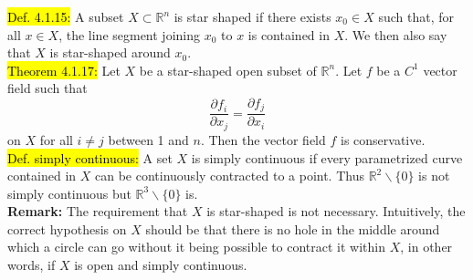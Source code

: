\documentclass[10pt,landscape]{article}
\newcommand{\green}[1]{\sethlcolor{green}\hl{#1}}
\newcommand{\blue}[1]{\sethlcolor{cyan} \hl{#1}}
\begin{document}
\begin{multicols}{3}
\blue{Def. 4.1.15:} A subset $X \subset \mathbb{R}^{n}$ is star shaped if there exists $x_{0} \in X$ such that, for all $x \in X$, 
the line segment joining $x_{0}$ to $x$ is contained in $X$. We then also say that $X$ is star-shaped around $x_{0}$.\\
\green{Theorem 4.1.17:} Let $X$ be a star-shaped open subset of $\mathbb{R}^{n}$. Let $f$ be a $C^{1}$ vector field such that
$$
\frac{\partial f_{i}}{\partial x_{j}}=\frac{\partial f_{j}}{\partial x_{i}}
$$
on $X$ for all $i \neq j$ between 1 and $n$. Then the vector field $f$ is conservative.\\
\blue{Def. simply continuous:} A set $X$ is simply continuous if every parametrized curve contained in $X$ can be continuously contracted to a point. Thus $\mathbb{R}^2 \backslash \{0\}$ is not simply continuous but 
$\mathbb{R}^3 \backslash \{0\}$ is. \\
\textbf{Remark:} The requirement that $X$ is star-shaped is not necessary. Intuitively, the correct hypothesis on $X$ should be that there is no \glqq hole\grqq{}
in the middle around which a circle can go without it being possible to contract it within $X$, in other words, if $X$ is open and simply continuous.\\

\end{multicols}
\end{document}
